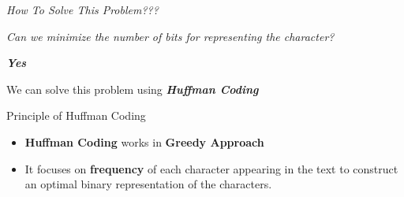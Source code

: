 \documentclass[12pt]{beamer}
\begin{document}
\begin{frame}


			\begin{block} {\color{blue}\textit{{{How To Solve This Problem???}}}} 
			\end{block}
            
            \pause
          
           \begin{block} {\color{orange}\textit{Can we minimize the number of bits for representing the character?} }
			\end{block}           
           
            \pause
           
			\begin{block}          
          		{\color{blue}\textbf{\textit{Yes}}}
          	\end{block}
            
            \pause
			
			\begin{block}          
          		{}
          	\end{block}            
            
            \pause
            \begin{block} {We can solve this problem using \color{red}\textbf{\textit{Huffman Coding}}}
          	\end{block}
            
           

\end{frame}
			
\begin{frame}{Principle of Huffman Coding}

\begin{itemize}
	\pause	
	\item {\color{red}\textbf{Huffman Coding}} works in {\color{orange}\textbf{Greedy Approach}}
	\pause
	\item It focuses on {\color{orange}\textbf{frequency}} of each character appearing in the text to construct an optimal binary representation of the characters. 
	
	
\end{itemize}



\end{frame}
\end{document}
